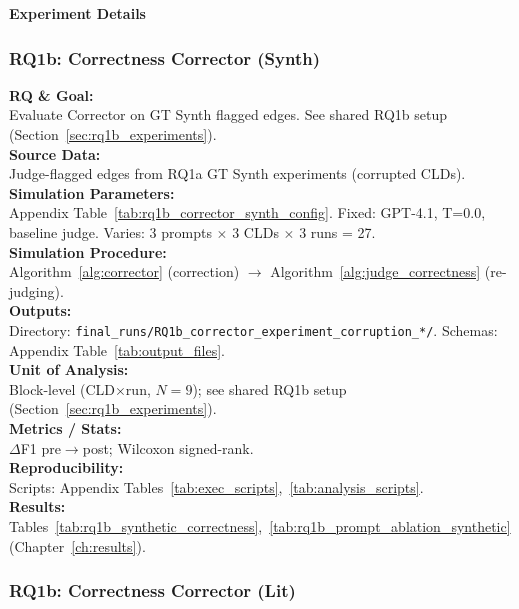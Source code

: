 \noindent\textbf{Experiment Details}

\subsubsection{RQ1b: Correctness Corrector (Synth)}
\label{sec:rq1b_corrector_synth}

\textbf{RQ \& Goal:}\\
Evaluate Corrector on GT Synth flagged edges. See shared RQ1b setup (Section~\ref{sec:rq1b_experiments}).\\
\textbf{Source Data:}\\
Judge-flagged edges from RQ1a GT Synth experiments (corrupted CLDs).\\
\textbf{Simulation Parameters:}\\
Appendix Table~\ref{tab:rq1b_corrector_synth_config}. Fixed: GPT-4.1, T=0.0, baseline judge. Varies: 3 prompts $\times$ 3 CLDs $\times$ 3 runs = 27.\\
\textbf{Simulation Procedure:}\\
Algorithm~\ref{alg:corrector} (correction) $\rightarrow$ Algorithm~\ref{alg:judge_correctness} (re-judging).\\
\textbf{Outputs:}\\
Directory: \texttt{final\_runs/RQ1b\_corrector\_experiment\_corruption\_*/}. Schemas: Appendix Table~\ref{tab:output_files}.\\
\textbf{Unit of Analysis:}\\
Block-level (CLD$\times$run, $N=9$); see shared RQ1b setup (Section~\ref{sec:rq1b_experiments}).\\
\textbf{Metrics / Stats:}\\
$\Delta$F1 pre$\rightarrow$post; Wilcoxon signed-rank.\\
\textbf{Reproducibility:}\\
Scripts: Appendix Tables~\ref{tab:exec_scripts},~\ref{tab:analysis_scripts}.\\
\textbf{Results:}\\
Tables~\ref{tab:rq1b_synthetic_correctness},~\ref{tab:rq1b_prompt_ablation_synthetic} (Chapter~\ref{ch:results}).

\subsubsection{RQ1b: Correctness Corrector (Lit)}
\label{sec:rq1b_corrector_lit}

